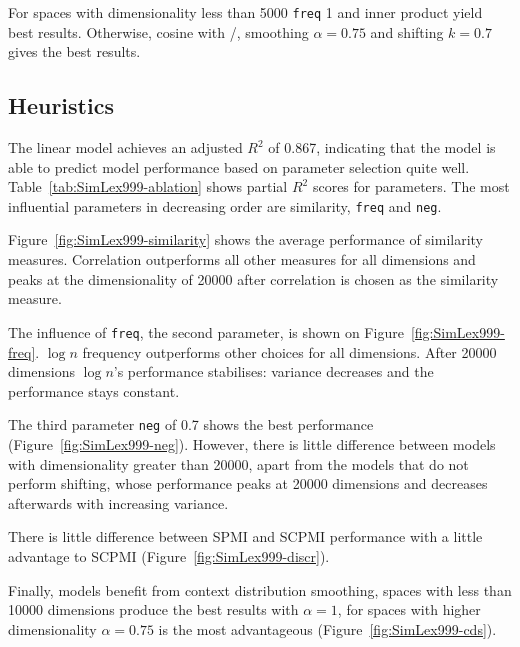 For spaces with dimensionality less than 5000 \texttt{freq} 1 and inner product yield best results. Otherwise, cosine with \logNSCPMI/, smoothing $\alpha=0.75$ and shifting $k=0.7$ gives the best results.



\subsection{Heuristics}
\label{sec:heuristics-simlex}



% 

The linear model achieves an adjusted $R^2$ of 0.867, indicating that the model is able to predict model performance based on parameter selection quite well. Table~\ref{tab:SimLex999-ablation} shows partial $R^2$ scores for parameters. The most influential parameters in decreasing order are similarity, \texttt{freq} and \texttt{neg}.


Figure~\ref{fig:SimLex999-similarity} shows the average performance of similarity measures. Correlation outperforms all other measures for all dimensions and peaks at the dimensionality of 20000 after correlation is chosen as the similarity measure.

% 
The influence of \texttt{freq}, the second parameter, is shown on Figure~\ref{fig:SimLex999-freq}. $\log n$ frequency outperforms other choices for all dimensions. After 20000 dimensions $\log n$'s performance stabilises: variance decreases and the performance stays constant.


The third parameter \texttt{neg} of 0.7 shows the best performance (Figure~\ref{fig:SimLex999-neg}). However, there is little difference between models with dimensionality greater than 20000, apart from the models that do not perform shifting, whose performance peaks at 20000 dimensions and decreases afterwards with increasing variance.

% 
There is little difference between SPMI and SCPMI performance with a little advantage to SCPMI (Figure~\ref{fig:SimLex999-discr}).


Finally, models benefit from context distribution smoothing, spaces with less than 10000 dimensions produce the best results with $\alpha = 1$, for spaces with higher dimensionality $\alpha = 0.75$ is the most advantageous (Figure~\ref{fig:SimLex999-cds}).

